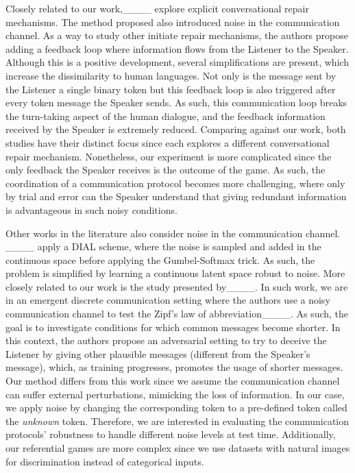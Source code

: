 Closely related to our work,____ explore explicit conversational repair mechanisms. The method proposed also introduced noise in the communication channel. As a way to study other initiate repair mechanisms, the authors propose adding a feedback loop where information flows from the Listener to the Speaker. Although this is a positive development, several simplifications are present, which increase the dissimilarity to human languages. Not only is the message sent by the Listener a single binary token but this feedback loop is also triggered after every token message the Speaker sends. As such, this communication loop breaks the turn-taking aspect of the human dialogue, and the feedback information received by the Speaker is extremely reduced. Comparing against our work, both studies have their distinct focus since each explores a different conversational repair mechanism. Nonetheless, our experiment is more complicated since the only feedback the Speaker receives is the outcome of the game. As such, the coordination of a communication protocol becomes more challenging, where only by trial and error can the Speaker understand that giving redundant information is advantageous in such noisy conditions.

Other works in the literature also consider noise in the communication channel. ____ apply a DIAL scheme, where the noise is sampled and added in the continuous space before applying the Gumbel-Softmax trick. As such, the problem is simplified by learning a continuous latent space robust to noise. More closely related to our work is the study presented by____. In such work, we are in an emergent discrete communication setting where the authors use a noisy communication channel to test the Zipf's law of abbreviation____. As such, the goal is to investigate conditions for which common messages become shorter. In this context, the authors propose an adversarial setting to try to deceive the Listener by giving other plausible messages (different from the Speaker's message), which, as training progresses, promotes the usage of shorter messages. Our method differs from this work since we assume the communication channel can suffer external perturbations, mimicking the loss of information. In our case, we apply noise by changing the corresponding token to a pre-defined token called the \textit{unknown} token. Therefore, we are interested in evaluating the communication protocols' robustness to handle different noise levels at test time. Additionally, our referential games are more complex since we use datasets with natural images for discrimination instead of categorical inputs.